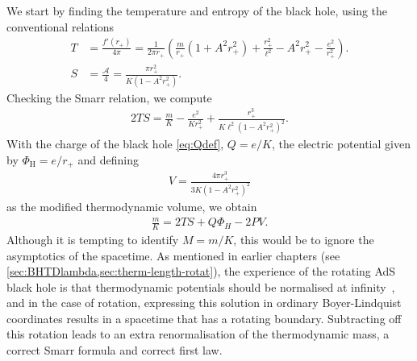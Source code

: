 \documentclass[
twoside,
openright,
frontopenright,
]{dmathesis}
\newcommand{\nn}{\nonumber}
\begin{document}
We start by finding the temperature and entropy of the black hole, using
the conventional relations
\begin{align}
  \label{eq:TSNR}
T &= \frac{f'(r_+)}{4\pi} = \frac{1}{2\pi r_+}\left(\frac{m}{r_+}\left(1+A^2r_+^2
\right) + \frac{r_+^2}{\ell^2} - A^2 r_+^2-\frac{e^2}{r_+^2}\right).\nn\\
S &= \frac{\mathcal{A}}{4} =\frac{\pi r_+^2}{K(1-A^2 r_+^2)}.
\end{align}
Checking the Smarr relation, we compute
\begin{align}
2TS = \frac{m}{K} - \frac{e^2}{K r_+^2} + \frac{r_+^3}{K\ell^2(1-A^2 r_+^2)^2}.
\end{align}
With the charge of the black hole \eqref{eq:Qdef}, $Q = e/K$, the electric
potential given by $\Phi_\mathrm{H} = e/r_+$ and defining 
\begin{align}
  \label{eq:volNR}
V  = \frac{4\pi r_+^3}{3K(1-A^2r_+^2)^2}
\end{align}
as the modified thermodynamic volume, we obtain
\begin{align}\label{eq:smallsmarr}
\frac{m}{K} = 2 TS  + Q\Phi_H - 2 PV.
\end{align}
Although it is tempting to identify $M=m/K$, this would be to ignore the
asymptotics of the spacetime. As mentioned in earlier chapters (see
\cref{sec:BHTDlambda,sec:therm-length-rotat}), the experience of the rotating
AdS black hole is that thermodynamic potentials should be normalised at
infinity~\cite{Caldarelli:1999xj,Gibbons:2004ai}, and in the case of rotation,
expressing this solution in ordinary Boyer-Lindquist coordinates results in a
spacetime that has a rotating boundary. Subtracting off this rotation leads to
an extra renormalisation of the thermodynamic mass, a correct Smarr formula and
correct first law.
\end{document}
